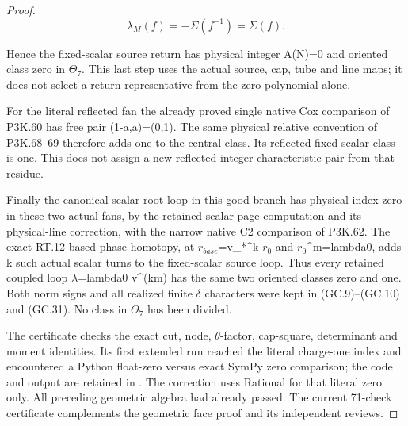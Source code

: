\begin{proof}
\[
                  \lambda_M(f)=-\Sigma(f^{-1})=\Sigma(f).
 \tag{GC.34}
\]

Hence the fixed-scalar source return has physical integer
A(N)=0 and oriented class zero in \(\Theta_7\). This last step uses
the actual source, cap, tube and line maps; it does not select
a return representative from the zero polynomial alone.

For the literal reflected fan the already proved single
native Cox comparison of P3K.60 has free pair (1-a,a)=(0,1).
The same physical relative convention of P3K.68--69 therefore
adds one to the central class. Its reflected fixed-scalar
class is one. This does not assign a new reflected integer
characteristic pair from that residue.

Finally the canonical scalar-root loop in this good branch
has physical index zero in these two actual fans, by the
retained scalar page computation and its physical-line
correction, with the narrow native C2 comparison of P3K.62.
The exact RT.12 based phase homotopy, at
\(r_{base}\)=v\_*\^{}k \(r_0\) and \(r_0\)\^{}m=lambda0, adds k such actual scalar
turns to the fixed-scalar source loop. Thus every retained
coupled loop \(\lambda\)=lambda0 v\^{}(km) has the same two oriented
classes zero and one. Both norm signs and all realized finite
\(\delta\) characters were kept in (GC.9)--(GC.10) and (GC.31).
No class in \(\Theta_7\) has been divided.

The certificate  checks the
exact cut, node, \(\theta\)-factor, cap-square, determinant and
moment identities. Its first extended run reached the literal
charge-one index and encountered a Python float-zero versus
exact SymPy zero comparison; the code and output are retained
in . The
correction uses Rational for that literal zero only. All
preceding geometric algebra had already passed. The current
71-check certificate complements the geometric face proof
and its independent reviews.
\end{proof}
